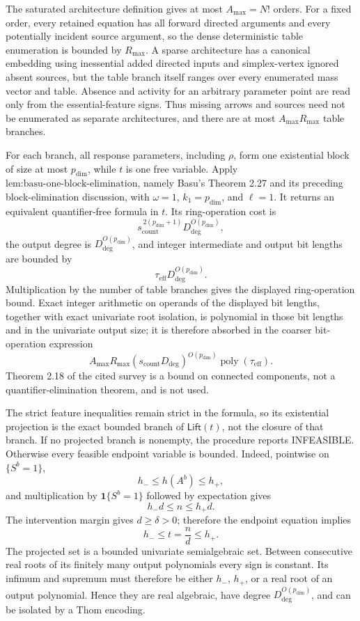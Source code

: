 The saturated architecture definition gives at most \(A_{\max}=N!\) orders.  For a fixed order, every retained equation has all forward directed arguments and every potentially incident source argument, so the dense deterministic table enumeration is bounded by \(R_{\max}\).  A sparse architecture has a canonical embedding using inessential added directed inputs and simplex-vertex ignored absent sources, but the table branch itself ranges over every enumerated mass vector and table.  Absence and activity for an arbitrary parameter point are read only from the essential-feature signs.  Thus missing arrows and sources need not be enumerated as separate architectures, and there are at most \(A_{\max}R_{\max}\) table branches.

For each branch, all response parameters, including \(\rho\), form one existential block of size at most \(p_{\mathrm{dim}}\), while \(t\) is one free variable.  Apply \(\text{lem:basu-one-block-elimination}\), namely Basu's Theorem 2.27 and its preceding block-elimination discussion, with \(\omega=1\), \(k_1=p_{\mathrm{dim}}\), and \(\ell=1\).  It returns an equivalent quantifier-free formula in \(t\).  Its ring-operation cost is
\[
s_{\mathrm{count}}^{\,2(p_{\mathrm{dim}}+1)}
D_{\mathrm{deg}}^{O(p_{\mathrm{dim}})},
\]
the output degree is \(D_{\mathrm{deg}}^{O(p_{\mathrm{dim}})}\), and integer intermediate and output bit lengths are bounded by
\[
\tau_{\mathrm{eff}}D_{\mathrm{deg}}^{O(p_{\mathrm{dim}})}.
\]
Multiplication by the number of table branches gives the displayed ring-operation bound.  Exact integer arithmetic on operands of the displayed bit lengths, together with exact univariate root isolation, is polynomial in those bit lengths and in the univariate output size; it is therefore absorbed in the coarser bit-operation expression
\[
A_{\max}R_{\max}
(s_{\mathrm{count}}D_{\mathrm{deg}})^{O(p_{\mathrm{dim}})}
\operatorname{poly}(\tau_{\mathrm{eff}}).
\]
Theorem 2.18 of the cited survey is a bound on connected components, not a quantifier-elimination theorem, and is not used.

The strict feature inequalities remain strict in the formula, so its existential projection is the exact bounded branch of \(\mathsf{Lift}(t)\), not the closure of that branch.  If no projected branch is nonempty, the procedure reports INFEASIBLE.  Otherwise every feasible endpoint variable is bounded.  Indeed, pointwise on \(\{S^b=1\}\),
\[
h_-\leq h(A^b)\leq h_+,
\]
and multiplication by \(\mathbf 1\{S^b=1\}\) followed by expectation gives
\[
h_-d\leq n\leq h_+d.
\]
The intervention margin gives \(d\geq\delta>0\); therefore the endpoint equation implies
\[
h_-\leq t=\frac nd\leq h_+.
\]
The projected set is a bounded univariate semialgebraic set.  Between consecutive real roots of its finitely many output polynomials every sign is constant.  Its infimum and supremum must therefore be either \(h_-\), \(h_+\), or a real root of an output polynomial.  Hence they are real algebraic, have degree \(D_{\mathrm{deg}}^{O(p_{\mathrm{dim}})}\), and can be isolated by a Thom encoding.

